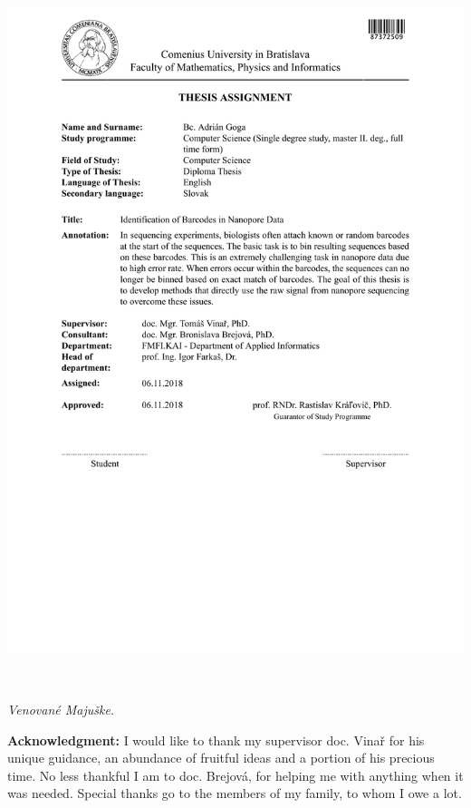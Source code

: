 \documentclass[12pt, twoside]{book}
\begin{document}
\hspace{-2cm}\includegraphics[width=1.1\textwidth]{images/zadanie_en.PDF}


\frontmatter

\setcounter{page}{3}
\newpage 
~

\vspace{10cm}
\hspace{5cm}
\textit{Venovan\'{e} Maju\v{s}ke.}
\vfill

{\bf Acknowledgment:} I would like to thank my supervisor doc. Vina\v{r} for his unique guidance, an abundance of fruitful ideas and a portion of his precious time. No less thankful I am to doc. Brejov\'a, for helping me with anything when it was needed. Special thanks go to the members of my family, to whom I owe a lot.
\end{document}
